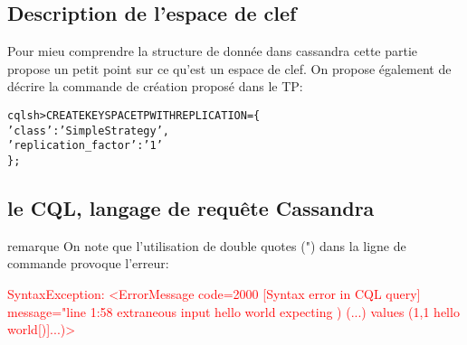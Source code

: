 \subsection{Description de l'espace de clef}
\par Pour mieu comprendre la structure de donnée dans cassandra
cette partie propose un petit point sur ce qu'est un espace de clef.
On propose également de décrire la commande de création proposé dans le TP: \newline
\begin{tt}
\begin{alltt}
cqlsh> CREATE KEYSPACE TP WITH REPLICATION = \{
		'class' : 'SimpleStrategy',
		'replication\_factor' : '1'
\};
\end{alltt}
\end{tt}
\subsection{le CQL, langage de requête Cassandra}


\par 
\begin{block}{remarque}
On note que l\rq utilisation de double quotes (") dans la ligne de commande provoque l'erreur: \newline
\begin{tt}
\textcolor{red}{
SyntaxException: <ErrorMessage code=2000 [Syntax error in CQL query]
message="line 1:58 extraneous input hello world expecting ) (...) values (1,1 hello world[)]...)>
}
\end{tt}
\end{block}
